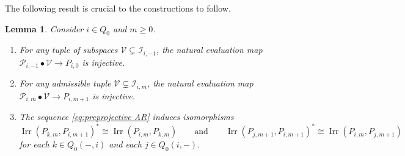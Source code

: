 \documentclass{amsart}
\newtheorem{lemma}[theorem]{Lemma}
\numberwithin{equation}{section}
\newcommand{\cI}{\mathcal{I}}
\newcommand{\cP}{\mathcal{P}}
\newcommand{\cV}{\mathcal{V}}
\newcommand{\Irr}{\operatorname{Irr}}
\begin{document}
The following result is crucial to the constructions to follow.
\begin{lemma}
  Consider $i\in Q_0$ and $m\ge0$.
  \begin{enumerate}
    \item For any tuple of subspaces $\cV\subsetneq\cI_{i,-1}$, the natural evaluation map $\cP_{i,-1}\bullet\cV\to P_{i,0}$ is injective.
    \item For any admissible tuple $\cV\subsetneq\cI_{i,m}$, the natural evaluation map $\cP_{i,m}\bullet\cV\to P_{i,m+1}$ is injective.
    \item The sequence \eqref{eq:preprojective AR} induces isomorphisms 
      \[\Irr(P_{k,m},P_{i,m+1})^*\cong \Irr(P_{i,m},P_{k,m}) \qquad \text{and} \qquad \Irr(P_{j,m+1},P_{i,m+1})^*\cong \Irr(P_{i,m},P_{j,m+1})\]
      for each $k\in Q_0(-,i)$ and each $j\in Q_0(i,-)$.
  \end{enumerate}
\end{lemma}
\end{document}
